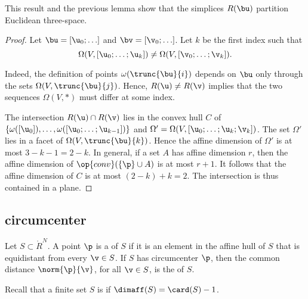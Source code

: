 This result and the previous lemma show that the simplices $R(\bu)$
partition Euclidean three-space.

\begin{proof} Let $\bu = [\u_0;\ldots]$ and $\bv = [\v_0;\ldots]$.  
Let $k$ be the
first index such that
\begin{displaymath} 
\Omega(V,[\u_0;\ldots;\u_{k}]) \ne \Omega(V,[\v_0;\ldots;\v_{k}]).
\end{displaymath}

  Indeed, the definition of points
$\omega(\trunc{\bu}{i})$ depends on $\bu$ only through the sets
$\Omega(V,\trunc{\bu}{j})$.  Hence, $R(\u)\ne R(\v)$ implies that the
two sequences $\Omega(V,*)$ must differ at some index.

The intersection $R(\u)\cap R(\v)$ lies in the convex hull $C$ of
$\{\omega([\u_0]),\ldots,\omega( [\u_0;\ldots; \u_{k-1}])\}$ and
$\Omega'=\Omega(V,[\u_0;\ldots;\u_{k};\v_{k}])$.  The set $\Omega'$
lies in a facet of $\Omega(V,\trunc{\bu}{k})$.  Hence the affine
dimension of $\Omega'$ is at most $3-k-1=2-k$.  In general, if a set
$A$ has affine dimension $r$, then the affine dimension of
$\op{conv}(\{\p\}\cup A)$ is at most $r+1$.  It follows that the
affine dimension of $C$ is at most $(2-k)+ k = 2$.  The intersection
is thus contained in a plane.
\end{proof}


\subsection{circumcenter}

\begin{definition} 
%
%
Let $S\subset\ring{R}^N$.  
A point $\p$ is a  of $S$ if it is an element
in the affine hull of $S$ that is equidistant from every $\v\in S$.  If $S$ has
circumcenter $\p$, then the common distance $\norm{\p}{\v}$, for all $\v\in S$,
is the  of  $S$.
\end{definition}

Recall that a finite set $S$
is  if $\dimaff(S) = \card(S) -1$.
%

